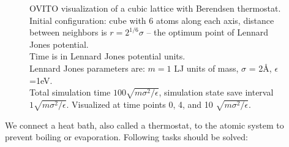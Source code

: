 \documentclass[12pt,a4paper]{article}
\begin{document}
\begin{figure}[h!]
\begin{minipage}{.3\textwidth}
	\end{minipage}
	\caption{OVITO visualization of a cubic lattice with Berendsen thermostat.\\
		Initial configuration: cube with 6 atoms along each axis, distance between neighbors is $r=2^{1/6}\sigma$ -- the optimum point of Lennard Jones potential.\\	
		Time is in Lennard Jones potential units.\\
		Lennard Jones parameters are: $m=1$ LJ units of mass, $\sigma$ = 2Å, $\epsilon$=1eV.\\
		Total simulation time \( 100 \sqrt{m\sigma^2 / \epsilon} \), simulation state save interval \( 1 \sqrt{m\sigma^2 / \epsilon} \).
		Visualized at time points 0, 4, and 10 $\sqrt{m\sigma^2 / \epsilon}$.
	}
	\label{fig:first_simulation_ovito}
\end{figure}

\clearpage

We connect a heat bath, also called a thermostat, to the atomic system to prevent boiling or evaporation. Following tasks should be solved:
\end{document}
